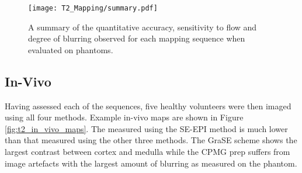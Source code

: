\begin{figure}[H]
	\centering
	\texttt{[image: T2\_Mapping/summary.pdf]}
	\caption{A summary of the quantitative accuracy, sensitivity to flow and degree of blurring observed for each \ttwo mapping sequence when evaluated on phantoms.}
	\label{fig:t2_summary}	
\end{figure}
\subsection{In-Vivo}

Having assessed each of the sequences, five healthy volunteers were then imaged using all four methods. Example in-vivo maps are shown in Figure \ref{fig:t2_in_vivo_maps}. The measured \ttwo using the \ac{SE}-\ac{EPI} method is much lower than that measured using the other three methods. The \ac{GraSE} scheme shows the largest contrast between cortex and medulla while the \ac{CPMG} \ttwo prep suffers from image artefacts with the largest amount of blurring as measured on the phantom.

